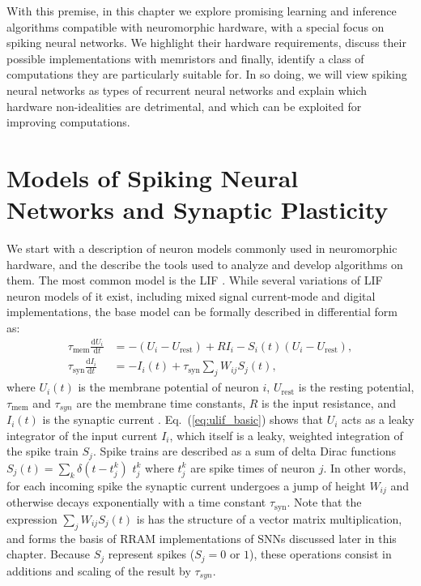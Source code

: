 \documentclass[english]{article}
\renewcommand{\refeq}[1]{{Eq.~(\ref{#1})}}
\renewcommand{\cite}{\citep}
\begin{document}
With this premise, in this chapter we explore promising learning and inference algorithms compatible with neuromorphic hardware, with a special focus on spiking neural networks. We highlight their hardware requirements, discuss their possible implementations with memristors and finally, identify a class of computations they are particularly suitable for.
In so doing, we will view spiking neural networks as types of recurrent neural networks and explain which hardware non-idealities are detrimental, and which can be exploited for improving computations.

\section{Models of Spiking Neural Networks and Synaptic Plasticity}\label{sec:lif}
We start with a description of neuron models commonly used in neuromorphic hardware, and the describe the tools used to analyze and develop algorithms on them. 
The most common model is the \ac{LIF} \cite{Indiveri_etal11_neursili}. While several variations of \ac{LIF} neuron models of it exist, including mixed signal current-mode and digital implementations, the base model can be formally described in differential form as:
\begin{align}
    \label{eq:ulif_basic}
    \tau_\mathrm{mem} \frac{\mathrm{d}U_i}{\mathrm{d}t} &= -(U_i-U_\mathrm{rest}) + RI_i - S_i(t)(U_i-U_\mathrm{rest}),\\
    \tau_\mathrm{syn} \frac{\mathrm{d}I_i}{\mathrm{d}t} &= -I_i(t) + \tau_\mathrm{syn}\sum_j W_{ij} S_j(t), 
    \label{eq:lif_basic}
\end{align}
where $U_i(t)$ is the membrane potential of neuron $i$, $U_\mathrm{rest}$ is the resting potential, $\tau_\mathrm{mem}$ and $\tau_{syn}$ are the membrane time constants, $R$ is the input resistance, and $I_i(t)$ is the synaptic current \cite{Gerstner_etal14_neurdyna}.
\refeq{eq:ulif_basic} shows that $U_i$ acts as a leaky integrator of the input current $I_i$, which itself is a leaky, weighted integration of the spike train $S_j$. Spike trains are described as a sum of delta Dirac functions $S_j(t) = \sum_k \delta(t-t_j^k)$ $t_j^k$ where $t_j^k$ are spike times of neuron $j$.
In other words, for each incoming spike the synaptic current undergoes a jump of height ${W_{ij}}$ and otherwise decays exponentially with a time constant $\tau_{\mathrm{syn}}$. Note that the expression $\sum_j W_{ij} S_j(t) $ is has the structure of a vector matrix multiplication, and forms the basis of RRAM implementations of \acp{SNN} discussed later in this chapter. Because $S_j$ represent spikes ($S_j=0$ or $1$), these operations consist in additions and scaling of the result by $\tau_{syn}$.
\end{document}
